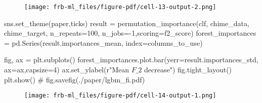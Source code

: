 \documentclass[
  letterpaper,
  DIV=11,
  numbers=noendperiod]{scrartcl}
\newenvironment{Shaded}{\begin{snugshade}}{\end{snugshade}}
\newcommand{\CommentTok}[1]{\textcolor[rgb]{0.37,0.37,0.37}{#1}}
\newcommand{\DecValTok}[1]{\textcolor[rgb]{0.68,0.00,0.00}{#1}}
\newcommand{\NormalTok}[1]{\textcolor[rgb]{0.00,0.23,0.31}{#1}}
\newcommand{\OperatorTok}[1]{\textcolor[rgb]{0.37,0.37,0.37}{#1}}
\newcommand{\StringTok}[1]{\textcolor[rgb]{0.13,0.47,0.30}{#1}}
\newcommand{\VerbatimStringTok}[1]{\textcolor[rgb]{0.13,0.47,0.30}{#1}}
\begin{document}
\begin{figure}[H]

{\centering \texttt{[image: frb-ml\_files/figure-pdf/cell-13-output-2.png]}

}

\end{figure}

\begin{Shaded}
\begin{Highlighting}[]
\NormalTok{sns.set\_theme(}\StringTok{\textquotesingle{}paper\textquotesingle{}}\NormalTok{,}\StringTok{\textquotesingle{}ticks\textquotesingle{}}\NormalTok{)}
\NormalTok{result }\OperatorTok{=}\NormalTok{ permutation\_importance(clf, chime\_data, chime\_target, n\_repeats}\OperatorTok{=}\DecValTok{100}\NormalTok{, n\_jobs}\OperatorTok{={-}}\DecValTok{1}\NormalTok{,scoring}\OperatorTok{=}\NormalTok{f2\_score)}
\NormalTok{forest\_importances }\OperatorTok{=}\NormalTok{ pd.Series(result.importances\_mean, index}\OperatorTok{=}\NormalTok{columns\_to\_use)}

\NormalTok{fig, ax }\OperatorTok{=}\NormalTok{ plt.subplots()}
\NormalTok{forest\_importances.plot.bar(yerr}\OperatorTok{=}\NormalTok{result.importances\_std, ax}\OperatorTok{=}\NormalTok{ax,capsize}\OperatorTok{=}\DecValTok{4}\NormalTok{)}
\NormalTok{ax.set\_ylabel(}\VerbatimStringTok{r"Mean $F\_2$ decrease"}\NormalTok{)}
\NormalTok{fig.tight\_layout()}
\NormalTok{plt.show()}
\CommentTok{\# fig.savefig(\textquotesingle{}./paper/lgbm\_fi.pdf\textquotesingle{})}
\end{Highlighting}
\end{Shaded}

\begin{figure}[H]

{\centering \texttt{[image: frb-ml\_files/figure-pdf/cell-14-output-1.png]}

}

\end{figure}
\end{document}
